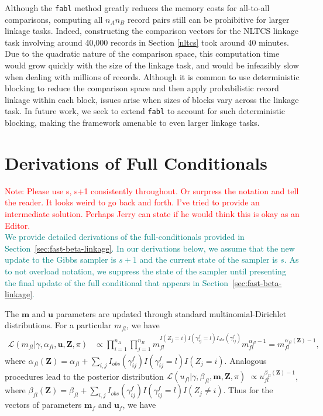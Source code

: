 \documentclass[ba]{imsart}
\begin{document}
	Although the \texttt{fabl} method greatly reduces the memory costs for all-to-all comparisons, computing all $n_A  n_B$ record pairs still can be prohibitive for larger linkage tasks. Indeed, constructing the comparison vectors for the NLTCS linkage task involving around 40,000 records in Section \ref{nltcs} took around 40 minutes. Due to the quadratic nature of the comparison space, this computation time would grow quickly with the size of the linkage task, and would be infeasibly slow when dealing with millions of records. Although it is common to use deterministic blocking to reduce the comparison space and then apply probabilistic record linkage within each block, issues arise when sizes of blocks vary across the linkage task. In future work, we seek to extend \texttt{fabl} to account for such deterministic blocking, making the framework amenable to even larger linkage tasks.

	
	\clearpage
	
	\bigskip
	
	
	
	
	\clearpage
	

\appendix
	
		
	
	\hypertarget{app:derivations}{%
	\section{Derivations of Full Conditionals}\label{app:derivations}}
\textcolor{red}{Note: Please use s, s+1 consistently throughout. Or surpress the notation and tell the reader. It looks weird to go back and forth. I've tried to provide an intermediate solution. Perhaps Jerry can state if he would think this is okay as an Editor.}\\

\textcolor{teal}{We provide detailed derivations of the full-conditionals provided in Section~\ref{sec:fast-beta-linkage}. In our derivations below, we assume that the new update to the Gibbs sampler is $s+1$ and the current state of the sampler is $s.$ As to not overload notation, we suppress the state of the sampler until presenting the final update of the full conditional that appears in Section~\ref{sec:fast-beta-linkage}.}

The $\bm{m}$ and $\bm{u}$ parameters are updated through standard multinomial-Dirichlet distributions. For a particular $m_{fl}$, we have
\begin{align*}
	\mathcal{L}(m_{fl}|\gamma, \alpha_{fl}, \bm{u}, \bm{Z}, \pi) &\propto \prod_{i=1}^{n_A} \prod_{j=1}^{n_B} m_{fl}^{I(Z_j = i) I(\gamma_{ij}^f = l) I_{obs}(\gamma_{ij}^f)}  m_{fl}^{\alpha_{fl} - 1} = m_{fl}^{\alpha_{fl}(\bm{Z}) - 1},
\end{align*}
where $\alpha_{fl}(\bm{Z})= \alpha_{fl} + \sum_{i,j} I_{obs}(\gamma_{ij}^f)I(\gamma_{ij}^f = l) I(Z_j = i)$. Analogous procedures lead to the posterior distribution $\mathcal{L}(u_{fl}| \gamma, \beta_{fl}, \bm{m}, \bm{Z}, \pi)$  $\propto u_{fl}^{\beta_{fl}(\bm{Z}) - 1}$, where $\beta_{fl}(\bm{Z})= \beta_{fl} + \sum_{i,j} I_{obs}(\gamma_{ij}^f)I(\gamma_{ij}^f = l) I(Z_j \neq i)$. Thus for the vectors of parameters $\bm{m}_f$ and $\bm{u}_f$, we have
\end{document}

